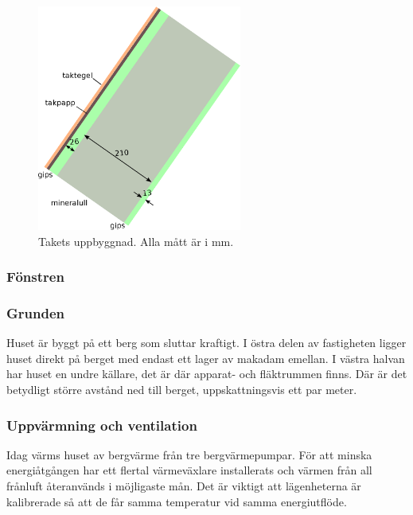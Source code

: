 \begin{figure}[hpbt]
\centering
\includegraphics[width=0.6\textwidth]{images/taket.eps}
\caption{\label{fig:taket}{Takets uppbyggnad. Alla mått är i mm.}}
\end{figure}

\subsubsection{Fönstren}

\subsubsection{Grunden}

Huset är byggt på ett berg som sluttar kraftigt. I östra delen av fastigheten ligger huset direkt på berget med endast ett lager av makadam emellan\cite{petersarneo}. I västra halvan har huset en undre källare, det är där apparat- och fläktrummen finns. Där är det betydligt större avstånd ned till berget, uppskattningsvis ett par meter. %

\subsubsection{Uppvärmning och ventilation}
Idag värms huset av bergvärme från tre bergvärmepumpar. För att minska energiåtgången har ett flertal värmeväxlare installerats och värmen från all frånluft återanvänds i möjligaste mån.
Det är viktigt att lägenheterna är kalibrerade så att de får samma temperatur vid samma energiutflöde.


